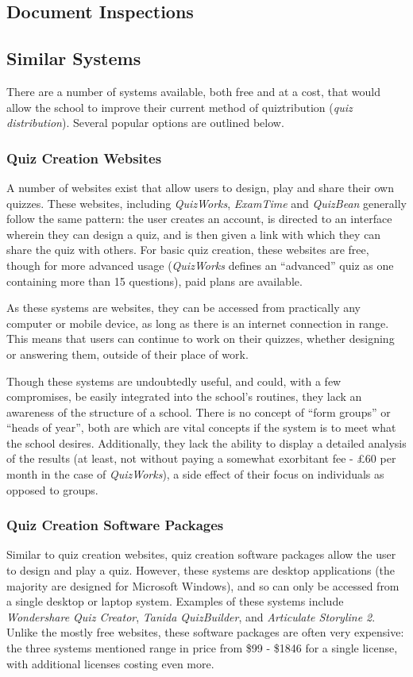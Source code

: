 \subsection{Document Inspections}

\subsection{Similar Systems}
There are a number of systems available, both free and at a cost, that would allow the school to improve their current method of quiztribution (\textit{quiz distribution}). Several popular options are outlined below.

\subsubsection{Quiz Creation Websites}
A number of websites exist that allow users to design, play and share their own quizzes. These websites, including \textit{QuizWorks}, \textit{ExamTime} and \textit{QuizBean} generally follow the same pattern: the user creates an account, is directed to an interface wherein they can design a quiz, and is then given a link with which they can share the quiz with others. For basic quiz creation, these websites are free, though for more advanced usage (\textit{QuizWorks} defines an ``advanced'' quiz as one containing more than 15 questions), paid plans are available.

As these systems are websites, they can be accessed from practically any computer or mobile device, as long as there is an internet connection in range. This means that users can continue to work on their quizzes, whether designing or answering them, outside of their place of work.

Though these systems are undoubtedly useful, and could, with a few compromises, be easily integrated into the school's routines, they lack an awareness of the structure of a school. There is no concept of ``form groups'' or ``heads of year'', both are which are vital concepts if the system is to meet what the school desires. Additionally, they lack the ability to display a detailed analysis of the results (at least, not without paying a somewhat exorbitant fee - \pounds60 per month in the case of \textit{QuizWorks}), a side effect of their focus on individuals as opposed to groups.

\subsubsection{Quiz Creation Software Packages}
Similar to quiz creation websites, quiz creation software packages allow the user to design and play a quiz. However, these systems are desktop applications (the majority are designed for Microsoft Windows), and so can only be accessed from a single desktop or laptop system. Examples of these systems include \textit{Wondershare Quiz Creator}, \textit{Tanida QuizBuilder}, and \textit{Articulate Storyline 2}. Unlike the mostly free websites, these software packages are often very expensive: the three systems mentioned range in price from \$99 - \$1846 for a single license, with additional licenses costing even more.

